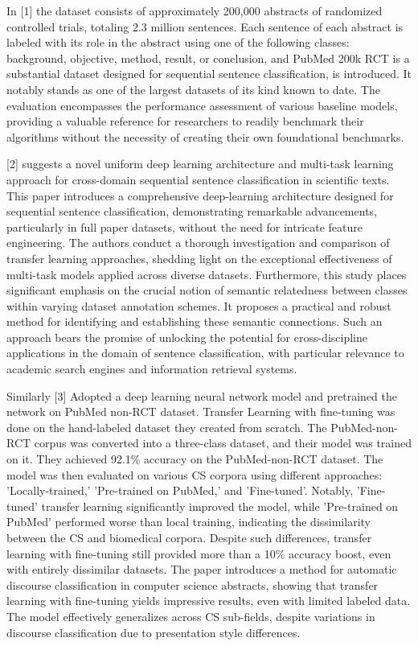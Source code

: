 \documentclass[12pt,a4paper]{report}     %
\begin{document}
\begin{normalsize}
{In [1] the dataset consists of approximately 200,000 abstracts of randomized controlled trials, totaling 2.3 million sentences. Each sentence of each abstract is labeled with its role in the abstract using one of the following classes: background, objective, method, result, or conclusion, and PubMed 200k RCT is a substantial dataset designed for sequential sentence classification, is introduced. It notably stands as one of the largest datasets of its kind known to date. The evaluation encompasses the performance assessment of various baseline models, providing a valuable reference for researchers to readily benchmark their algorithms without the necessity of creating their own foundational benchmarks.

[2] suggests a novel uniform deep learning architecture and multi-task learning approach for cross-domain sequential sentence classification in scientific texts. This paper introduces a comprehensive deep-learning architecture designed for sequential sentence classification, demonstrating remarkable advancements, particularly in full paper datasets, without the need for intricate feature engineering. The authors conduct a thorough investigation and comparison of transfer learning approaches, shedding light on the exceptional effectiveness of multi-task models applied across diverse datasets. Furthermore, this study places significant emphasis on the crucial notion of semantic relatedness between classes within varying dataset annotation schemes. It proposes a practical and robust method for identifying and establishing these semantic connections. Such an approach bears the promise of unlocking the potential for cross-discipline applications in the domain of sentence classification, with particular relevance to academic search engines and information retrieval systems.

Similarly [3] Adopted a deep learning neural network model and pretrained the network on PubMed non-RCT dataset. Transfer Learning with fine-tuning was done on the hand-labeled dataset they created from scratch. The PubMed-non-RCT corpus was converted into a three-class dataset, and their model was trained on it. They achieved 92.1\% accuracy on the PubMed-non-RCT dataset. The model was then evaluated on various CS corpora using different approaches: 'Locally-trained,' 'Pre-trained on PubMed,' and 'Fine-tuned'. Notably, 'Fine-tuned' transfer learning significantly improved the model, while 'Pre-trained on PubMed' performed worse than local training, indicating the dissimilarity between the CS and biomedical corpora. Despite such differences, transfer learning with fine-tuning still provided more than a 10\% accuracy boost, even with entirely dissimilar datasets. The paper introduces a method for automatic discourse classification in computer science abstracts, showing that transfer learning with fine-tuning yields impressive results, even with limited labeled data. The model effectively generalizes across CS sub-fields, despite variations in discourse classification due to presentation style differences.

}
\end{normalsize}
\end{document}
